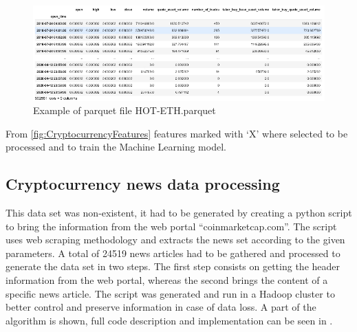 \begin{figure}[H]
   \centering
   \includegraphics[width=\linewidth]{fig/ExampleParquetFile HOT-ETH.png}
    \caption{Example of parquet file HOT-ETH.parquet}
    \label{fig:CryptocurrencyDataSetParquetFile}
\end{figure}

From \ref{fig:CryptocurrencyFeatures} features marked with ‘X’ where selected to be processed and to train the Machine Learning model.

\subsection{Cryptocurrency news data processing}
This data set was non-existent, it had to be generated by creating a python script to bring the information from the web portal “coinmarketcap.com”. The script uses web scraping methodology and extracts the news set according to the given parameters.  
A total of 24519 news articles had to be gathered and processed to generate the data set in two steps.
The first step consists on getting the header information from the web portal, whereas the second brings the content of a specific  news article.
 The script was generated and run in a Hadoop cluster to better control and preserve information in case of data loss. 
A part of the algorithm is shown, full code description and implementation can be seen in \cite{christopher_olah_understanding_2015}.

